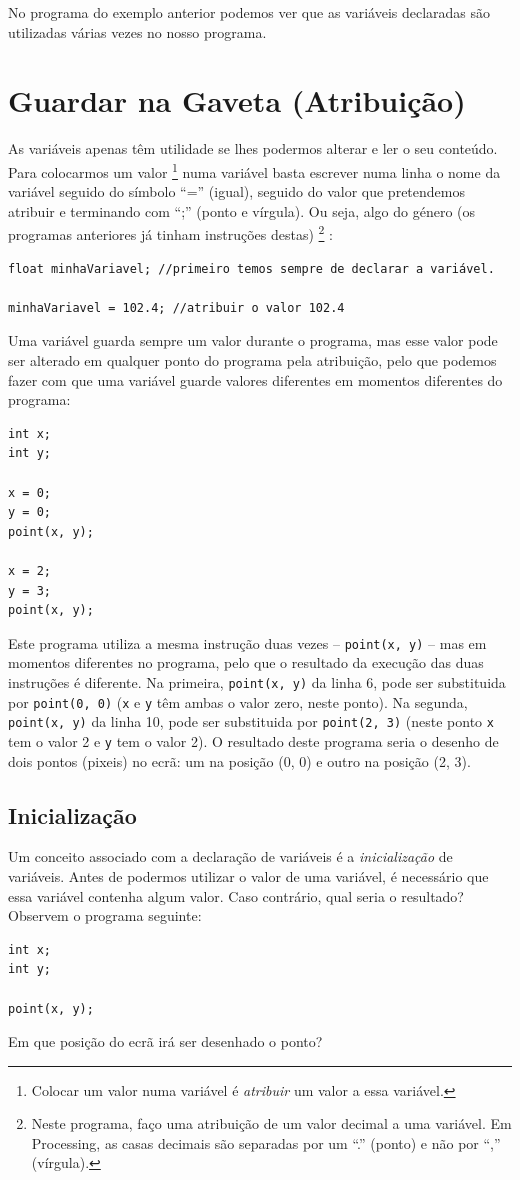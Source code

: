 No programa do exemplo anterior podemos ver que as variáveis declaradas são utilizadas várias vezes no nosso programa.


\section{Guardar na Gaveta (Atribuição)}
As variáveis apenas têm utilidade se lhes podermos alterar e ler o seu conteúdo. Para colocarmos um valor%
\footnote{Colocar um valor numa variável é \emph{atribuir} um valor a essa variável.}
 numa variável basta escrever numa linha o nome da variável seguido do símbolo ``='' (igual), seguido do valor que pretendemos atribuir e terminando com ``;'' (ponto e vírgula).
Ou seja, algo do género (os programas anteriores já tinham instruções destas)%
\footnote{Neste programa, faço uma atribuição de um valor decimal a uma variável. Em Processing, as casas decimais são separadas por um ``.'' (ponto) e não por ``,'' (vírgula).}%
:
\begin{lstlisting}
float minhaVariavel; //primeiro temos sempre de declarar a variável.

minhaVariavel = 102.4; //atribuir o valor 102.4
\end{lstlisting}


Uma variável guarda sempre um valor durante o programa, mas esse valor pode ser alterado em qualquer ponto do programa pela atribuição, pelo que podemos fazer com que uma variável guarde valores diferentes em momentos diferentes do programa:
\begin{lstlisting}
int x;
int y;

x = 0;
y = 0;
point(x, y);

x = 2;
y = 3;
point(x, y);
\end{lstlisting}
Este programa utiliza a mesma instrução duas vezes -- \texttt{point(x, y)} -- mas em momentos diferentes no programa, pelo que o resultado da execução das duas instruções é diferente.
Na primeira, \texttt{point(x, y)} da linha 6, pode ser substituida por \texttt{point(0, 0)} (\texttt{x} e \texttt{y} têm ambas o valor zero, neste ponto).
Na segunda, \texttt{point(x, y)} da linha 10, pode ser substituida por \texttt{point(2, 3)} (neste ponto \texttt{x} tem o valor 2 e \texttt{y} tem o valor 2). 
O resultado deste programa seria o desenho de dois pontos (pixeis) no ecrã: um na posição (0, 0) e outro na posição (2, 3).


\subsection{Inicialização}
Um conceito associado com a declaração de variáveis é a \emph{inicialização} de variáveis. Antes de podermos utilizar o valor de uma variável, é necessário que essa variável contenha algum valor. Caso contrário, qual seria o resultado? Observem o programa seguinte:
\begin{lstlisting}
int x;
int y;

point(x, y);
\end{lstlisting}
Em que posição do ecrã irá ser desenhado o ponto?

